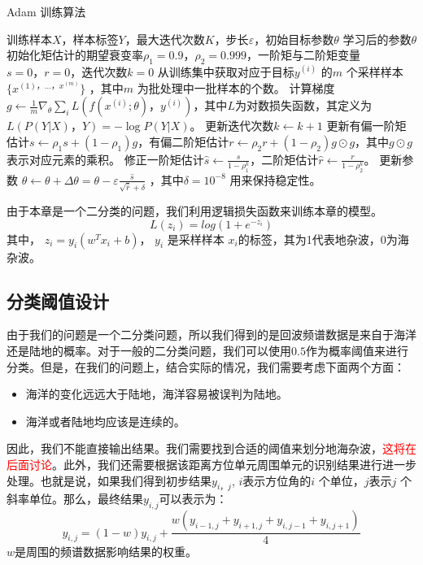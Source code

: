 \begin{algorithm}[H]
	\caption{Adam 训练算法}
	\begin{algorithmic}[1] %
		\Require 训练样本$X$，样本标签$Y$，最大迭代次数$K$，步长$\varepsilon$，初始目标参数$\theta$
		\Ensure 学习后的参数$\theta$  
		\State 初始化矩估计的期望衰变率$\rho_1=0.9，\rho_2=0.999$，一阶矩与二阶矩变量$s=0，r=0$，迭代次数$k=0$ 
			\State 从训练集中获取对应于目标$y^{(i)}$ 的$m$ 个采样样本 $\{x^{(1)，\dots，x^{(m)}}\}$ ，其中$m$ 为批处理中一批样本的个数。
			\label{line:start}
			\State 计算梯度$g \leftarrow \frac{1}{m} \nabla_{\theta} \sum_i L(f(x^{(i)};\theta)， y^{(i)}) $，其中$L$为对数损失函数，其定义为$L(P(Y|X)，Y) = - \log P(Y|X) $。
			\State 更新迭代次数$k \leftarrow k+1 $
			\State 更新有偏一阶矩估计$s \leftarrow \rho_1 s + (1 - \rho_1) g $，有偏二阶矩估计$r \leftarrow \rho_2 r + (1-\rho_2) g \odot g $，其中$ g \odot g $表示对应元素的乘积。
			\State 修正一阶矩估计$\hat{s} \leftarrow \frac{s}{1-\rho^k_1} $，二阶矩估计$\hat{r} \leftarrow \frac{r}{1-\rho^k_2} $。
			\State 更新参数 $\theta \leftarrow \theta + \Delta \theta = \theta - \varepsilon \frac{\hat{s}}{\sqrt{\hat{r}} + \delta} $
			，其中$\delta = 10^{-8} $
			用来保持稳定性。
		\EndWhile
	\end{algorithmic}
\end{algorithm}

由于本章是一个二分类的问题，我们利用逻辑损失函数来训练本章的模型。
\begin{equation}
	L(z_i) = log(1+e^{-z_i})
\end{equation}
其中， $z_i=y_i(w^T x_i + b)$， $y_i$ 是采样样本 $x_i$的标签，其为1代表地杂波，0为海杂波。

\subsection{分类阈值设计}
由于我们的问题是一个二分类问题，所以我们得到的是回波频谱数据是来自于海洋还是陆地的概率。对于一般的二分类问题，我们可以使用$ 0.5 $作为概率阈值来进行分类。但是，在我们的问题上，结合实际的情况，我们需要考虑下面两个方面：
\begin{itemize}
	\item 海洋的变化远远大于陆地，海洋容易被误判为陆地。
	\item 海洋或者陆地均应该是连续的。
\end{itemize}
因此，我们不能直接输出结果。我们需要找到合适的阈值来划分地海杂波，\textcolor{red}{这将在后面讨论}。此外，我们还需要根据该距离方位单元周围单元的识别结果进行进一步处理。也就是说，如果我们得到初步结果$y_{i， j}$, $i$表示方位角的$ i $ 个单位，$ j $表示$ j $ 个斜率单位。那么，最终结果$y_{i, j}$可以表示为：
\begin{equation}
y_{i, j} = (1 - w)  y_{i, j} + \frac{w  (y_{i - 1, j} + y_{i + 1, j} + y_{i, j - 1} + y_{i, j + 1})}{4}
\end{equation}
$ w $是周围的频谱数据影响结果的权重。


